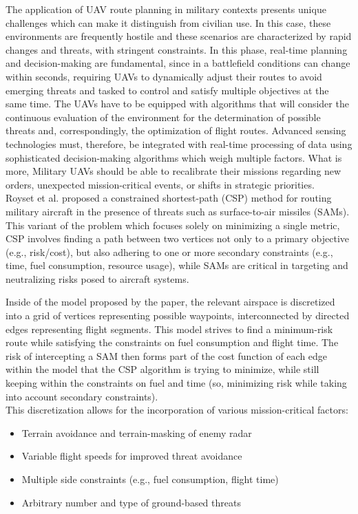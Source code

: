 \documentclass[conference]{IEEEtran}
\begin{document}
The application of UAV route planning in military contexts presents unique challenges which can make it distinguish from civilian use. In this case, these environments are frequently hostile and these scenarios are characterized by rapid changes and threats, with stringent constraints. In this phase, real-time planning and decision-making are fundamental, since in a battlefield conditions can change within seconds, requiring UAVs to dynamically adjust their routes to avoid emerging threats and tasked to control and satisfy multiple objectives at the same time. The UAVs have to be equipped with algorithms that will consider the continuous evaluation of the environment for the determination of possible threats and, correspondingly, the optimization of flight routes. Advanced sensing technologies must, therefore, be integrated with real-time processing of data using sophisticated decision-making algorithms which weigh multiple factors. What is more, Military UAVs should be able to recalibrate their missions regarding new orders, unexpected mission-critical events, or shifts in strategic priorities. \\

Royset et al. \cite{paper1} proposed a constrained shortest-path (CSP) method for routing military aircraft in the presence of threats such as surface-to-air missiles (SAMs). This variant of the problem which focuses solely on minimizing a single metric, CSP involves finding a path between two vertices not only to a primary objective (e.g., risk/cost), but also adhering to one or more secondary constraints (e.g., time, fuel consumption, resource usage), while SAMs are critical in targeting and neutralizing risks posed to aircraft systems.

Inside of the model proposed by the paper, the relevant airspace is discretized into a grid of vertices representing possible waypoints, interconnected by directed edges representing flight segments. This model strives to find a minimum-risk route while satisfying the constraints on fuel consumption and flight time. The risk of intercepting a SAM then forms part of the cost function of each edge within the model that the CSP algorithm is trying to minimize, while still keeping within the constraints on fuel and time (so, minimizing risk while taking into account secondary constraints). \\

This discretization allows for the incorporation of various mission-critical factors:

\begin{itemize}
    \item Terrain avoidance and terrain-masking of enemy radar
    \item Variable flight speeds for improved threat avoidance
    \item Multiple side constraints (e.g., fuel consumption, flight time)
    \item Arbitrary number and type of ground-based threats
\end{itemize}
\end{document}
